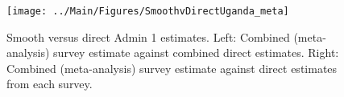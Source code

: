 \documentclass[12pt]{article}\usepackage[]{graphicx}\usepackage[]{color}
\newenvironment{knitrout}{}{} %
\begin{document}



\begin{knitrout}
\color{fgcolor}\begin{figure}[bht]

{\centering \texttt{[image: ../Main/Figures/SmoothvDirectUganda\_meta]} 

}

\caption[Smooth versus direct Admin 1 estimates]{Smooth versus direct Admin 1 estimates. Left: Combined (meta-analysis) survey estimate against combined direct estimates. Right: Combined (meta-analysis) survey estimate against direct estimates from each survey.}\label{fig:unnamed-chunk-323}
\end{figure}


\end{knitrout}
\end{document}
